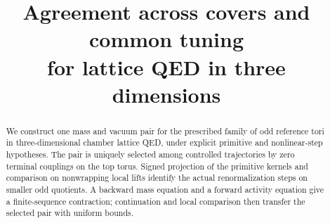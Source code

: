 \theoremstyle{remark}
\newtheorem{remark}[ms@proposition]{Remark}
\newtheorem*{remark*}{Remark}


  \RequirePackage[backend=biber,style=alphabetic,backref=true,
    giveninits=true,isbn=false,date=year]{biblatex}
  
  \setcounter{biburlnumpenalty}{100}
  \setcounter{biburllcpenalty}{100}
  \setcounter{biburlucpenalty}{100}
  \renewcommand*{\bibfont}{\footnotesize}
\makeatother
\usepackage{mathrsfs}
\newcommand{\R}{\mathbb R}
\newcommand{\C}{\mathbb C}
\newcommand{\Z}{\mathbb Z}
\newcommand{\N}{\mathbb N}
\newcommand{\Sspace}{\mathcal S}
\newcommand{\dd}{\mathrm d}
\DeclareMathOperator{\supp}{supp}
\DeclareMathOperator{\tr}{tr}
\DeclareMathOperator{\diag}{diag}
\newcommand{\extref}[2]{#1 of~\cite{#2}}
\newcommand{\exteq}[2]{(#1) of~\cite{#2}}
\allowdisplaybreaks
\title[Agreement across covers and common tuning]{Agreement across covers and common tuning\\for lattice QED in three dimensions}
\date{}

\begin{abstract}
We construct one mass and vacuum pair for the prescribed family of odd
reference tori in three-dimensional chamber lattice QED, under explicit
primitive and nonlinear-step hypotheses. The pair is uniquely selected
among controlled trajectories by zero terminal couplings on the top
torus. Signed projection of the primitive kernels and comparison on
nonwrapping local lifts identify the actual renormalization steps on
smaller odd quotients. A backward mass equation and a forward activity
equation give a finite-sequence contraction; continuation and local
comparison then transfer the selected pair with uniform bounds.
\end{abstract}
\maketitle
\tableofcontents

